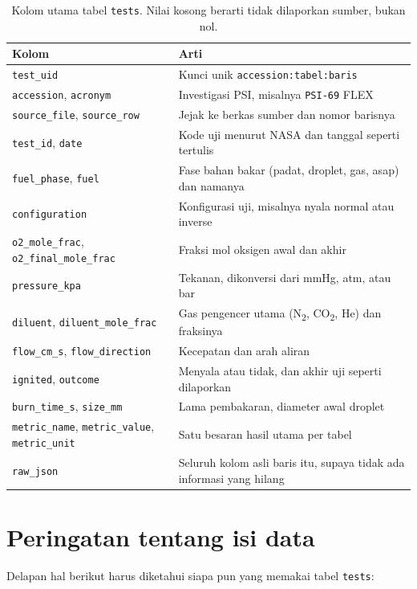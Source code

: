 \documentclass[11pt,a4paper]{report}
\newcommand{\COd}{CO\textsubscript{2}}
\newcommand{\Nd}{N\textsubscript{2}}
\begin{document}
\begin{table}[ht]
\centering\small
\caption{Kolom utama tabel \texttt{tests}. Nilai kosong berarti tidak dilaporkan sumber, bukan nol.}
\label{tab:kolom}
\begin{tabularx}{\linewidth}{@{}l X@{}}
\toprule
Kolom & Arti\\
\midrule
\texttt{test\_uid} & Kunci unik \texttt{accession:tabel:baris}\\
\texttt{accession}, \texttt{acronym} & Investigasi PSI, misalnya \texttt{PSI-69} FLEX\\
\texttt{source\_file}, \texttt{source\_row} & Jejak ke berkas sumber dan nomor barisnya\\
\texttt{test\_id}, \texttt{date} & Kode uji menurut NASA dan tanggal seperti tertulis\\
\texttt{fuel\_phase}, \texttt{fuel} & Fase bahan bakar (padat, droplet, gas, asap) dan namanya\\
\texttt{configuration} & Konfigurasi uji, misalnya nyala normal atau inverse\\
\texttt{o2\_mole\_frac}, \texttt{o2\_final\_mole\_frac} & Fraksi mol oksigen awal dan akhir\\
\texttt{pressure\_kpa} & Tekanan, dikonversi dari mmHg, atm, atau bar\\
\texttt{diluent}, \texttt{diluent\_mole\_frac} & Gas pengencer utama (\Nd, \COd, He) dan fraksinya\\
\texttt{flow\_cm\_s}, \texttt{flow\_direction} & Kecepatan dan arah aliran\\
\texttt{ignited}, \texttt{outcome} & Menyala atau tidak, dan akhir uji seperti dilaporkan\\
\texttt{burn\_time\_s}, \texttt{size\_mm} & Lama pembakaran, diameter awal droplet\\
\texttt{metric\_name}, \texttt{metric\_value}, \texttt{metric\_unit} & Satu besaran hasil utama per tabel\\
\texttt{raw\_json} & Seluruh kolom asli baris itu, supaya tidak ada informasi yang hilang\\
\bottomrule
\end{tabularx}
\end{table}

\section{Peringatan tentang isi data}

Delapan hal berikut harus diketahui siapa pun yang memakai tabel \texttt{tests}:
\end{document}
